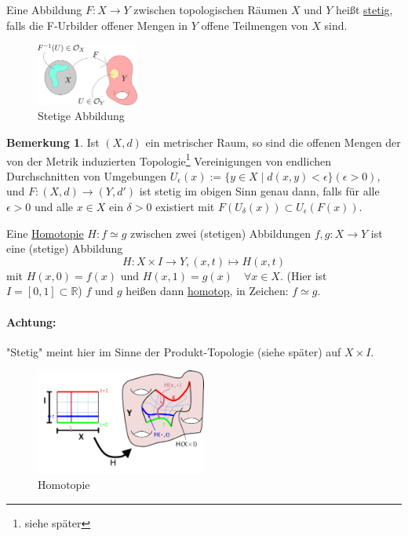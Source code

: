 \documentclass[a4paper,11pt,notitlepage]{report}
\theoremstyle{definition}
\newtheorem{remark}{Bemerkung}[chapter]
\newcommand{\R}{{\ensuremath{\mathbb{R}}}}
\newenvironment{definition}[1]{
	\begin{definitions}
	\marginnote{\emph{#1}}
}{\end{definitions}}
\begin{document}
\begin{definition}{Stetigkeit}
Eine Abbildung $F \colon X \rightarrow Y$ zwischen topologischen Räumen $X$ und $Y$ heißt \underline{stetig}, falls die F-Urbilder offener Mengen in $Y$ offene Teilmengen von $X$ sind.
\end{definition}

\begin{figure}[h]
\centering
\includegraphics[width=0.3\textwidth]{images/stetigeAbb.pdf}
\caption{Stetige Abbildung}
\end{figure}

\begin{remark}
Ist $(X,d)$ ein metrischer Raum, so sind die offenen Mengen der von der Metrik induzierten Topologie\footnote{siehe später} Vereinigungen von endlichen Durchschnitten von Umgebungen
$U_{\epsilon}(x):=\{y \in X \mid d (x,y) < \epsilon \} (\epsilon > 0)$, 
und $F \colon (X,d) \rightarrow (Y,d')$ ist stetig im obigen Sinn genau dann, falls für alle $\epsilon > 0$ und alle $x \in X$ ein $\delta > 0$ existiert mit $F(U_\delta (x)) \subset U_\epsilon (F(x))$.
\end{remark}

\begin{definition}{Homotopie}
Eine \underline{Homotopie} $H \colon f \simeq g$ zwischen zwei (stetigen) Abbildungen $f,g \colon X \rightarrow Y$ ist eine (stetige) Abbildung $$H \colon X \times I \rightarrow Y, (x,t) \mapsto H(x,t)$$ 
mit $H(x,0) = f(x) \text{ und } H(x,1) = g(x) \quad \forall x \in X$.
\newline
(Hier ist $I = [0,1] \subset \R$)
\newline
$f$ und $g$ heißen dann \underline{homotop}, in Zeichen: $f \simeq g$.
\end{definition}

\paragraph{Achtung:} "Stetig" meint hier im Sinne der Produkt-Topologie (siehe später) auf $
X \times I$.

\begin{figure}[h]
\centering
\includegraphics[width=0.5\textwidth]{images/Homotopie.png}
\caption{Homotopie}
\end{figure}
\end{document}
